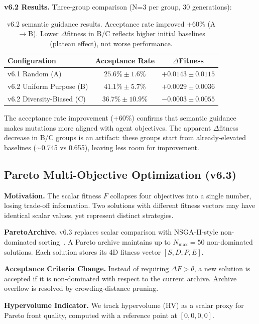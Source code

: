 \documentclass[11pt]{article}
\begin{document}
\textbf{v6.2 Results.} Three-group comparison (N=3 per group, 30 generations):

\begin{table}[h]
\centering
\begin{tabular}{lcc}
\toprule
\textbf{Configuration} & \textbf{Acceptance Rate} & \textbf{$\Delta$Fitness} \\
\midrule
v6.1 Random (A) & $25.6\% \pm 1.6\%$ & $+0.0143 \pm 0.0115$ \\
v6.2 Uniform Purpose (B) & $\mathbf{41.1\% \pm 5.7\%}$ & $+0.0029 \pm 0.0036$ \\
v6.2 Diversity-Biased (C) & $36.7\% \pm 10.9\%$ & $-0.0003 \pm 0.0055$ \\
\bottomrule
\end{tabular}
\caption{v6.2 semantic guidance results. Acceptance rate improved +60\% (A$\to$B). Lower $\Delta$fitness in B/C reflects higher initial baselines (plateau effect), not worse performance.}
\label{tab:v62_results}
\end{table}

The acceptance rate improvement (+60\%) confirms that semantic guidance makes mutations more aligned with agent objectives. The apparent $\Delta$fitness decrease in B/C groups is an artifact: these groups start from already-elevated baselines ($\sim$0.745 vs 0.655), leaving less room for improvement.


\subsection{Pareto Multi-Objective Optimization (v6.3)}

\textbf{Motivation.} The scalar fitness $F$ collapses four objectives into a single number, losing trade-off information. Two solutions with different fitness vectors may have identical scalar values, yet represent distinct strategies.

\textbf{ParetoArchive.} v6.3 replaces scalar comparison with NSGA-II-style non-dominated sorting~\cite{deb2002}. A Pareto archive maintains up to $N_{\max}=50$ non-dominated solutions. Each solution stores its 4D fitness vector $[S, D, P, E]$.

\textbf{Acceptance Criteria Change.} Instead of requiring $\Delta F > \theta$, a new solution is accepted if it is non-dominated with respect to the current archive. Archive overflow is resolved by crowding-distance pruning.

\textbf{Hypervolume Indicator.} We track hypervolume (HV) as a scalar proxy for Pareto front quality, computed with a reference point at $[0, 0, 0, 0]$.
\end{document}
